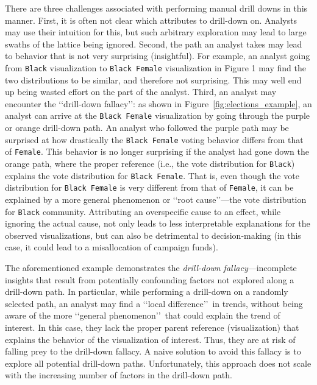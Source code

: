 There are three challenges associated with performing manual drill downs in this manner. First, it is often not clear which attributes to drill-down on. Analysts may use their intuition for this, but such arbitrary exploration may lead to large swaths of the lattice being ignored. Second, the path an analyst takes may lead to behavior that is not very surprising (insightful).  
For example, an analyst going from \texttt{Black} visualization to \texttt{Black Female} visualization in Figure 1 may find the two distributions to be similar, and therefore not surprising. This may well end up being wasted effort on the part of the analyst. Third, an analyst may encounter the \lq\lq drill-down fallacy\rq\rq : as shown in Figure~\ref{fig:elections_example}, an analyst can arrive at the \texttt{Black Female} visualization by going through the purple or orange drill-down path. An analyst who followed the purple path may be surprised at how drastically the \texttt{Black Female} voting behavior differs from that of \texttt{Female}. This behavior is no longer surprising if the analyst had gone down the orange path, where the proper reference (i.e., the vote distribution for \texttt{Black}) explains the vote distribution for \texttt{Black Female}. That is, even though the vote distribution for \texttt{Black Female} is very different from that of \texttt{Female}, it can be explained by a more general phenomenon or \lq\lq root cause\rq\rq ---the vote distribution for \texttt{Black} community. Attributing an overspecific cause to an effect, while ignoring the actual cause, not only leads to less interpretable explanations for the observed visualizations, but can also be detrimental to decision-making (in this case, it could lead to a misallocation of campaign funds).
\par The aforementioned example demonstrates the \emph{drill-down fallacy}---incomplete insights that result from potentially confounding factors not explored along a drill-down path. In particular, while performing a drill-down on a randomly selected path, an analyst may find a \lq\lq local difference\rq\rq\ in trends, without being aware of the more \lq\lq general phenomenon\rq\rq\ that could explain the trend of interest. In this case, they lack the proper parent reference (visualization) that explains the behavior of the visualization of interest. Thus, they are at risk of falling prey to the drill-down fallacy. A naive solution to avoid this fallacy is to explore all potential drill-down paths. Unfortunately, this approach does not scale with the increasing number of factors in the drill-down path.
